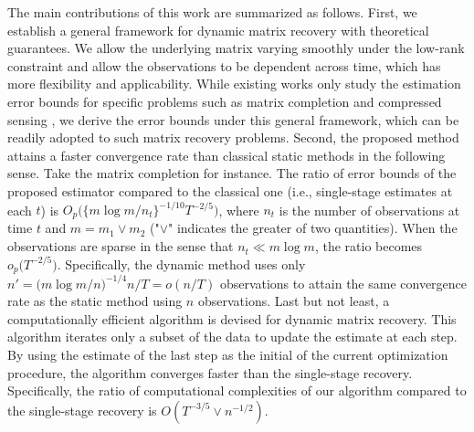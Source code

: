 \documentclass[12pt]{article}
\begin{document}
  The main contributions of this work are summarized as follows.
  First, we establish a general framework for dynamic matrix recovery with theoretical guarantees. We allow the underlying matrix varying smoothly under the low-rank constraint and allow the observations to be dependent across time, which has more flexibility and applicability. While existing works only study the estimation error bounds for specific problems such as matrix completion and compressed sensing \citep{koltchinskii_nuclear-norm_2011,negahban2011estimation,xu2016dynamic,fan2021shrinkage}, we derive the error bounds under this general framework, which can be readily adopted to such matrix recovery problems.
  Second, the proposed method attains a faster convergence rate than classical static methods in the following sense. Take the matrix completion for instance. The ratio of error bounds of the proposed estimator compared to the classical one (i.e., single-stage estimates at each $t$) is $O_p\big(\{m\log m/n_t\}^{-1/10}T^{-2/5}\big)$, where $n_t$ is the number of observations at time $t$ and $m=m_1\vee m_2$ ("$\vee$" indicates the greater of two quantities). When the observations are sparse in the sense that $n_t\ll m\log m$, the ratio becomes $o_p\big(T^{-2/5}\big)$. %
  Specifically, the dynamic method uses only $n'=\big(m\log m/n\big)^{-1/4}n/T=o(n/T)$ observations to attain the same convergence rate as the static method using $n$ observations.
  Last but not least, a computationally efficient algorithm is devised for dynamic matrix recovery. This algorithm iterates only a subset of the data to update the estimate at each step. By using the estimate of the last step as the initial of the current optimization procedure, the algorithm converges faster than the single-stage recovery. Specifically, the ratio of computational complexities of our algorithm compared to the single-stage recovery is $O(T^{-3/5}\vee n^{-1/2})$.%
\end{document}
